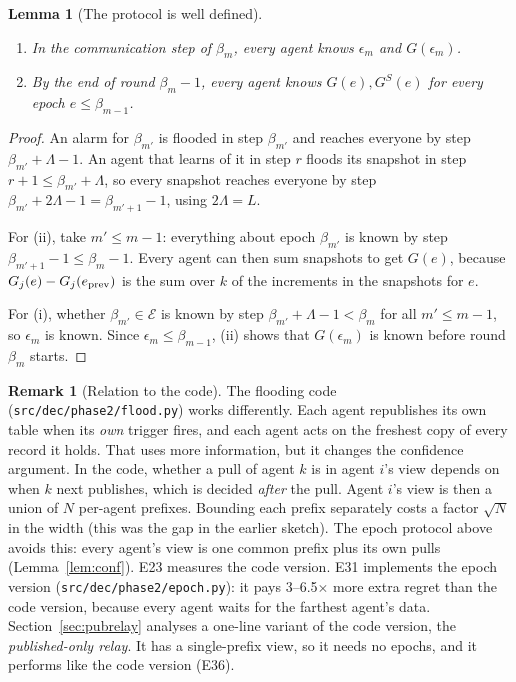 \documentclass[11pt]{article}
\newtheorem{lemma}[theorem]{Lemma}
\theoremstyle{definition}
\newtheorem{remark}{Remark}
\newcommand{\cE}{\mathcal{E}}
\begin{document}
\begin{lemma}[The protocol is well defined]\label{lem:welldef}
\begin{enumerate}[nosep,label=(\roman*)]
\item In the communication step of $\beta_m$, every agent knows $\epsilon_m$ and $G(\epsilon_m)$.
\item By the end of round $\beta_m-1$, every agent knows $G(e),G^S(e)$ for every epoch $e\le\beta_{m-1}$.
\end{enumerate}
\end{lemma}
\begin{proof}
An alarm for $\beta_{m'}$ is flooded in step $\beta_{m'}$ and reaches everyone by step $\beta_{m'}+\Lambda-1$. An agent
that learns of it in step $r$ floods its snapshot in step $r+1\le\beta_{m'}+\Lambda$, so every snapshot reaches everyone
by step $\beta_{m'}+2\Lambda-1=\beta_{m'+1}-1$, using $2\Lambda=L$.

For (ii), take $m'\le m-1$: everything about epoch $\beta_{m'}$ is known by step $\beta_{m'+1}-1\le\beta_m-1$.
Every agent can then sum snapshots to get $G(e)$, because $G_j(e)-G_j(e_{\rm prev})$ is the sum over $k$ of the
increments in the snapshots for $e$.

For (i), whether $\beta_{m'}\in\cE$ is known by step $\beta_{m'}+\Lambda-1<\beta_m$ for all $m'\le m-1$, so $\epsilon_m$
is known. Since $\epsilon_m\le\beta_{m-1}$, (ii) shows that $G(\epsilon_m)$ is known before round $\beta_m$ starts.
\end{proof}

\begin{remark}[Relation to the code]\label{rem:code}
The flooding code (\texttt{src/dec/phase2/flood.py}) works differently. Each agent republishes its own table when its
\emph{own} trigger fires, and each agent acts on the freshest copy of every record it holds. That uses more information,
but it changes the confidence argument. In the code, whether a pull of agent $k$ is in agent $i$'s view depends on
when $k$ next publishes, which is decided \emph{after} the pull. Agent $i$'s view is then a union of $N$ per-agent
prefixes. Bounding each prefix separately costs a factor $\sqrt N$ in the width (this was the gap in the earlier sketch).
The epoch protocol above avoids this: every agent's view is one common prefix plus its own pulls (Lemma~\ref{lem:conf}).
E23 measures the code version. E31 implements the epoch version (\texttt{src/dec/phase2/epoch.py}): it pays
3--6.5$\times$ more extra regret than the code version, because every agent waits for the farthest agent's data.
Section~\ref{sec:pubrelay} analyses a one-line variant of the code version, the \emph{published-only relay}. It has a
single-prefix view, so it needs no epochs, and it performs like the code version (E36).
\end{remark}
\end{document}
